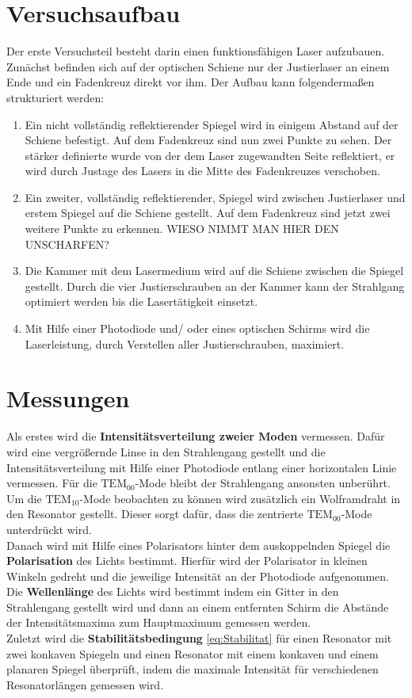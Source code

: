 \section{Versuchsaufbau}
Der erste Versuchsteil besteht darin einen funktionsfähigen Laser aufzubauen. Zunächst befinden sich auf der optischen Schiene nur der Justierlaser an einem Ende und ein Fadenkreuz direkt vor ihm. Der Aufbau kann folgendermaßen strukturiert werden:
\begin{enumerate}
	\item Ein nicht vollständig reflektierender Spiegel wird in einigem Abstand auf der Schiene befestigt. Auf dem Fadenkreuz sind nun zwei Punkte zu sehen. Der stärker definierte wurde von der dem Laser zugewandten Seite reflektiert, er wird durch Justage des Lasers in die Mitte des Fadenkreuzes verschoben.
	\item Ein zweiter, vollständig reflektierender, Spiegel wird zwischen Justierlaser und erstem Spiegel auf die Schiene gestellt. Auf dem Fadenkreuz sind jetzt zwei weitere Punkte zu erkennen. WIESO  NIMMT MAN HIER DEN UNSCHARFEN?
	\item Die Kammer mit dem Lasermedium wird auf die Schiene zwischen die Spiegel gestellt. Durch die vier Justierschrauben an der Kammer kann der Strahlgang optimiert werden bis die Lasertätigkeit einsetzt.
	\item Mit Hilfe einer Photodiode und/ oder eines optischen Schirms wird die Laserleistung, durch Verstellen aller Justierschrauben, maximiert.
\end{enumerate}

\section{Messungen}
Als erstes wird die \textbf{Intensitätsverteilung zweier Moden} vermessen. Dafür wird eine vergrößernde Linse in den Strahlengang gestellt und die Intensitätsverteilung mit Hilfe einer Photodiode entlang einer horizontalen Linie vermessen. Für die $\text{TEM}_{00}$-Mode bleibt der Strahlengang ansonsten unberührt. Um die $\text{TEM}_{10}$-Mode beobachten zu können wird zusätzlich ein Wolframdraht in den Resonator gestellt. Dieser sorgt dafür, dass die zentrierte $\text{TEM}_{00}$-Mode unterdrückt wird. \\
Danach wird mit Hilfe eines Polarisators hinter dem auskoppelnden Spiegel die \textbf{Polarisation} des Lichts bestimmt. Hierfür wird der Polarisator in kleinen Winkeln gedreht und die jeweilige Intensität an der Photodiode aufgenommen. \\
Die \textbf{Wellenlänge} des Lichts wird bestimmt indem ein Gitter in den Strahlengang gestellt wird und dann an einem entfernten Schirm die Abstände der Intensitätsmaxima zum Hauptmaximum gemessen werden. \\
Zuletzt wird die \textbf{Stabilitätsbedingung} \eqref{eq:Stabilitat} für einen Resonator mit zwei konkaven Spiegeln und einen Resonator mit einem konkaven und einem planaren Spiegel überprüft, indem die maximale Intensität für verschiedenen Resonatorlängen gemessen wird.